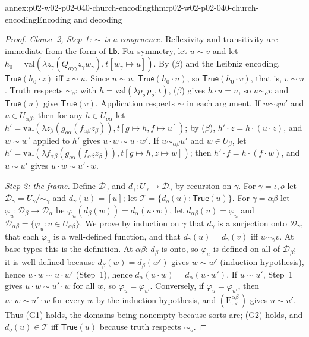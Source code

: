 \begin{annexitem}{annex:p02-w02-p02-040-church-encoding}{thm:p02-w02-p02-040-church-encoding}{Encoding and decoding}
\begin{proof}
\emph{Clause 2, Step 1: \(\sim\) is a congruence.}  Reflexivity and
transitivity are immediate from the form of \(\mathsf{Lb}\).  For symmetry, let
\(u\sim v\) and let \(h_0=\mathrm{val}(\lambda z_\gamma(Q_{o\gamma\gamma}z_\gamma w_\gamma),t[w_\gamma\mapsto u])\).
By (\(\beta\)) and the Leibniz encoding, \(\mathsf{True}(h_0\cdot z)\) iff
\(z\sim u\).  Since \(u\sim u\), \(\mathsf{True}(h_0\cdot u)\), so
\(\mathsf{True}(h_0\cdot v)\), that is, \(v\sim u\).  Truth respects \(\sim_o\):
with \(h=\mathrm{val}(\lambda p_o\,p_o,t)\), (\(\beta\)) gives \(h\cdot u=u\), so
\(u\sim_o v\) and \(\mathsf{True}(u)\) give \(\mathsf{True}(v)\).  Application
respects \(\sim\) in each argument.  If \(w\sim_\beta w'\) and
\(u\in U_{\alpha\beta}\), then for any \(h\in U_{o\alpha}\) let
\(h'=\mathrm{val}(\lambda z_\beta(g_{o\alpha}(f_{\alpha\beta}z_\beta)),t[g\mapsto h,f\mapsto u])\);
by (\(\beta\)), \(h'\cdot z=h\cdot(u\cdot z)\), and \(w\sim w'\) applied to \(h'\)
gives \(u\cdot w\sim u\cdot w'\).  If \(u\sim_{\alpha\beta}u'\) and
\(w\in U_\beta\), let
\(h'=\mathrm{val}(\lambda f_{\alpha\beta}(g_{o\alpha}(f_{\alpha\beta}z_\beta)),t[g\mapsto h,z\mapsto w])\);
then \(h'\cdot f=h\cdot(f\cdot w)\), and \(u\sim u'\) gives
\(u\cdot w\sim u'\cdot w\).

\emph{Step 2: the frame.}  Define \(\mathcal D_\gamma\) and
\(d_\gamma:U_\gamma\to\mathcal D_\gamma\) by recursion on \(\gamma\).  For
\(\gamma=\iota,o\) let \(\mathcal D_\gamma=U_\gamma/{\sim_\gamma}\) and
\(d_\gamma(u)=[u]\); let \(\mathcal T=\{d_o(u):\mathsf{True}(u)\}\).  For
\(\gamma=\alpha\beta\) let \(\varphi_u:\mathcal D_\beta\to\mathcal D_\alpha\) be
\(\varphi_u(d_\beta(w))=d_\alpha(u\cdot w)\), let \(d_{\alpha\beta}(u)=\varphi_u\)
and \(\mathcal D_{\alpha\beta}=\{\varphi_u:u\in U_{\alpha\beta}\}\).  We prove by
induction on \(\gamma\) that \(d_\gamma\) is a surjection onto
\(\mathcal D_\gamma\), that each \(\varphi_u\) is a well-defined function, and
that \(d_\gamma(u)=d_\gamma(v)\) iff \(u\sim_\gamma v\).  At base types this is
the definition.  At \(\alpha\beta\): \(d_\beta\) is onto, so \(\varphi_u\) is
defined on all of \(\mathcal D_\beta\); it is well defined because
\(d_\beta(w)=d_\beta(w')\) gives \(w\sim w'\) (induction hypothesis), hence
\(u\cdot w\sim u\cdot w'\) (Step~1), hence
\(d_\alpha(u\cdot w)=d_\alpha(u\cdot w')\).  If \(u\sim u'\), Step~1 gives
\(u\cdot w\sim u'\cdot w\) for all \(w\), so \(\varphi_u=\varphi_{u'}\).
Conversely, if \(\varphi_u=\varphi_{u'}\), then \(u\cdot w\sim u'\cdot w\) for
every \(w\) by the induction hypothesis, and
\((\mathrm E_{\mathrm{ext}}^{\alpha\beta})\) gives \(u\sim u'\).  Thus (G1) holds,
the domains being nonempty because sorts are; (G2) holds, and
\(d_o(u)\in\mathcal T\) iff \(\mathsf{True}(u)\) because truth respects
\(\sim_o\).


\end{proof}
\end{annexitem}
